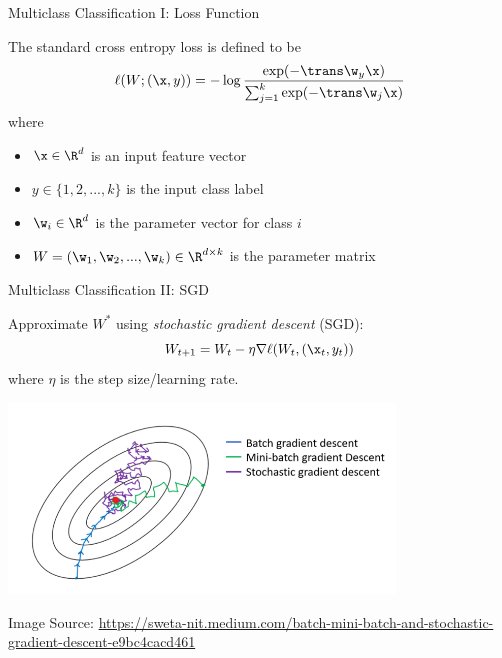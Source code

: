 \begin{frame}{Multiclass Classification I: Loss Function}

\vspace{0.1in}
The standard cross entropy loss is defined to be
\begin{equation}
    \label{eq:xentropy}
    \ell(W;(\x,y)) = - \log \frac {\exp(-\trans\w_y \x)}{\sum_{j=1}^k \exp(-\trans \w_j \x)}
\vspace{-0.1in}
\end{equation}
where
\begin{itemize}
    \item $\x \in \R^d$ is an input feature vector
    \item $y \in \{1, 2, ..., k\}$ is the input class label
    \item $\w_i \in \R^d$ is the parameter vector for class $i$
    \item $W = (\w_1, \w_2, ..., \w_k) \in \R^{d\times k}$ is the parameter matrix
\end{itemize}

\end{frame}

\begin{frame}{Multiclass Classification II: SGD}

Approximate $W^*$ using \emph{stochastic gradient descent} (SGD):
\begin{equation}
    W_{t+1} = W_t - \eta \nabla \ell(W_t, (\x_t, y_t))
\end{equation}
where $\eta$ is the step size/learning rate.


\includegraphics[height=2in]{img/sgd}

{\tiny
Image Source: \url{https://sweta-nit.medium.com/batch-mini-batch-and-stochastic-gradient-descent-e9bc4cacd461}
}
\end{frame}

